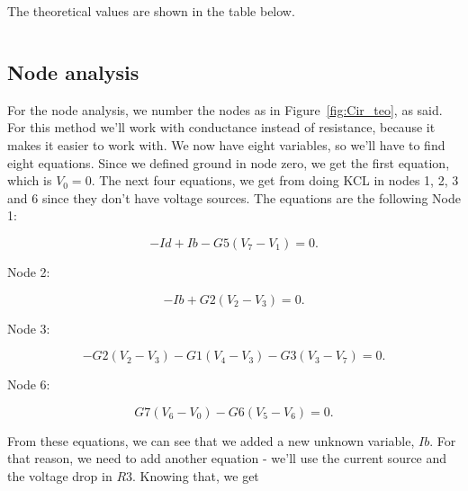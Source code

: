 \par The theoretical values are shown in the table below.
\vspace{5mm}
\begin{table}[ht]
\centering
\begin{tabularx}{0.8\textwidth} {
  | >{\raggedright\arraybackslash}X
  | >{\raggedleft\arraybackslash}X | }
 \hline

\end{tabularx}
\end{table}
\vspace{5mm}

\subsection{Node analysis}
\label{ssec:Node analysis}

\par For the node analysis, we number the nodes as in Figure~\ref{fig:Cir_teo}, as said. For this method we'll work with conductance instead of resistance, because it makes it easier to work with. We now have eight variables, so we'll have to find eight equations. Since we defined ground in node zero, we get the first equation, which is $V_0=0$. The next four equations, we get from doing KCL in nodes 1, 2, 3 and 6 since they don't have voltage sources. The equations are the following
\vspace{5mm}
Node 1:

 \begin{equation}
  -Id + Ib - G5(V_7-V_1) = 0.
  \label{eq:N1}
\end{equation}

Node 2:

 \begin{equation}
  -Ib + G2(V_2-V_3) = 0.
  \label{eq:N2}
\end{equation}

Node 3:

 \begin{equation}
  -G2(V_2-V_3)-G1(V_4-V_3)-G3(V_3-V_7) = 0.
  \label{eq:N3}
\end{equation}

Node 6:

 \begin{equation}
  G7(V_6-V_0)-G6(V_5-V_6) = 0.
  \label{eq:N6}
\end{equation}

\par From these equations, we can see that we added a new unknown variable, $Ib$. For that reason, we need to add another equation - we'll use the current source and the voltage drop in $R3$. Knowing that, we get

